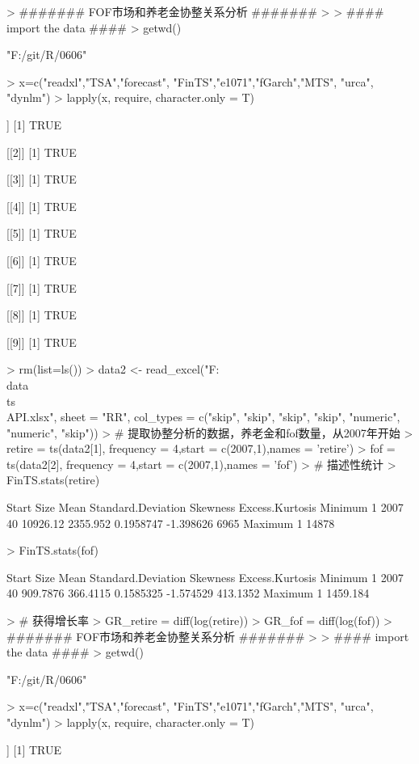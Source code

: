\documentclass{article}
\begin{document}


\begin{Schunk}
\begin{Sinput}
> ####### FOF市场和养老金协整关系分析 #######
> 
> #### import the data ####
> getwd()
\end{Sinput}
\begin{Soutput}
[1] "F:/git/R/0606"
\end{Soutput}
\begin{Sinput}
> x=c("readxl","TSA","forecast", "FinTS","e1071","fGarch","MTS", "urca", "dynlm")
> lapply(x, require, character.only = T)
\end{Sinput}
\begin{Soutput}
[[1]]
[1] TRUE

[[2]]
[1] TRUE

[[3]]
[1] TRUE

[[4]]
[1] TRUE

[[5]]
[1] TRUE

[[6]]
[1] TRUE

[[7]]
[1] TRUE

[[8]]
[1] TRUE

[[9]]
[1] TRUE
\end{Soutput}
\begin{Sinput}
> rm(list=ls())
> data2 <- read_excel("F:\\data\\ts\\API.xlsx", sheet = "RR", col_types = c("skip", "skip", "skip", "skip", "numeric", "numeric", "skip"))
> # 提取协整分析的数据，养老金和fof数量，从2007年开始
> retire = ts(data2[1], frequency = 4,start = c(2007,1),names = 'retire')
> fof = ts(data2[2], frequency = 4,start = c(2007,1),names = 'fof')
> # 描述性统计
> FinTS.stats(retire)
\end{Sinput}
\begin{Soutput}
  Start Size     Mean Standard.Deviation  Skewness Excess.Kurtosis Minimum
1  2007   40 10926.12           2355.952 0.1958747       -1.398626    6965
  Maximum
1   14878
\end{Soutput}
\begin{Sinput}
> FinTS.stats(fof)
\end{Sinput}
\begin{Soutput}
  Start Size     Mean Standard.Deviation  Skewness Excess.Kurtosis  Minimum
1  2007   40 909.7876           366.4115 0.1585325       -1.574529 413.1352
   Maximum
1 1459.184
\end{Soutput}
\begin{Sinput}
> # 获得增长率
> GR_retire = diff(log(retire))
> GR_fof = diff(log(fof))
> ####### FOF市场和养老金协整关系分析 #######
> 
> #### import the data ####
> getwd()
\end{Sinput}
\begin{Soutput}
[1] "F:/git/R/0606"
\end{Soutput}
\begin{Sinput}
> x=c("readxl","TSA","forecast", "FinTS","e1071","fGarch","MTS", "urca", "dynlm")
> lapply(x, require, character.only = T)
\end{Sinput}
\begin{Soutput}
[[1]]
[1] TRUE


\end{Soutput}
\end{Schunk}
\end{document}
